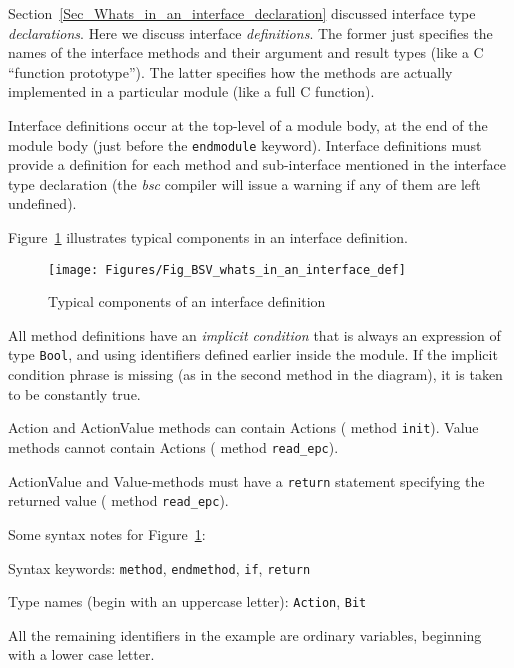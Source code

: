 
Section~\ref{Sec_Whats_in_an_interface_declaration} discussed
interface type \emph{declarations}.  Here we discuss interface
\emph{definitions}.  The former just specifies the names of the
interface methods and their argument and result types (like a C
``function prototype'').  The latter specifies how the methods are
actually implemented in a particular module (like a full C function).

Interface definitions occur at the top-level of a module body, at the
end of the module body (just before the \verb|endmodule| keyword).
Interface definitions must provide a definition for each method and
sub-interface mentioned in the interface type declaration (the
\emph{bsc} compiler will issue a warning if any of them are left
undefined).

Figure~\ref{Fig_BSV_whats_in_an_interface_def} illustrates typical
components in an interface definition.
\begin{figure}[htbp]
  \centerline{\texttt{[image: Figures/Fig\_BSV\_whats\_in\_an\_interface\_def]}}
  \caption{\label{Fig_BSV_whats_in_an_interface_def}
           Typical components of an interface definition}
\end{figure}
All method definitions have an \emph{implicit condition} that is
always an expression of type \verb|Bool|, and using identifiers
defined earlier inside the module.  If the implicit condition phrase
is missing (as in the second method in the diagram), it is taken to be
constantly true.

Action and ActionValue methods can contain Actions ({\eg} method
\verb|init|).  Value methods cannot contain Actions ({\eg} method
\verb|read_epc|).

ActionValue and Value-methods must have a \verb|return| statement
specifying the returned value ({\eg} method \verb|read_epc|).

Some syntax notes for Figure~\ref{Fig_BSV_whats_in_an_interface_def}:

\begin{tightlist}

 \item Syntax keywords: \verb|method|, \verb|endmethod|, \verb|if|, \verb|return|

 \item Type names (begin with an uppercase letter): \verb|Action|, \verb|Bit|

 \item All the remaining identifiers in the example are ordinary
       variables, beginning with a lower case letter.

\end{tightlist}

